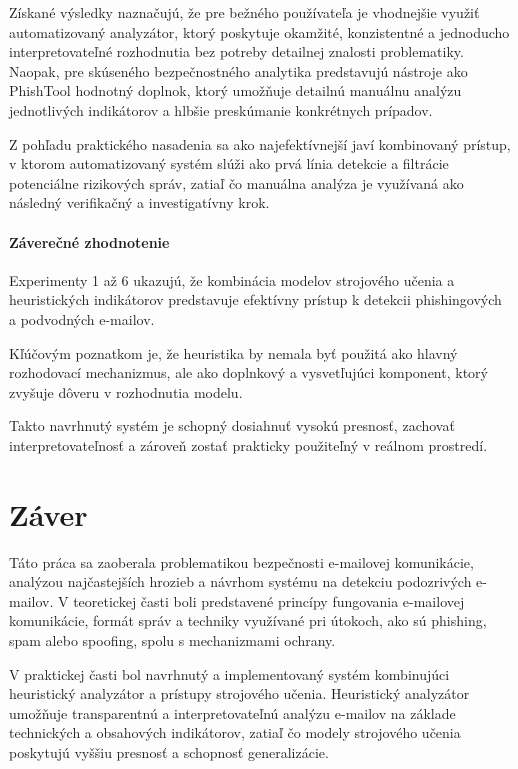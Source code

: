 \documentclass[conference]{IEEEtran}
\begin{document}
Získané výsledky naznačujú, že pre bežného používateľa je vhodnejšie
využiť automatizovaný analyzátor, ktorý poskytuje okamžité,
konzistentné a jednoducho interpretovateľné rozhodnutia bez potreby
detailnej znalosti problematiky. Naopak, pre skúseného bezpečnostného
analytika predstavujú nástroje ako PhishTool hodnotný doplnok, ktorý
umožňuje detailnú manuálnu analýzu jednotlivých indikátorov a hlbšie
preskúmanie konkrétnych prípadov.

Z pohľadu praktického nasadenia sa ako najefektívnejší javí kombinovaný
prístup, v ktorom automatizovaný systém slúži ako prvá línia detekcie
a filtrácie potenciálne rizikových správ, zatiaľ čo manuálna analýza
je využívaná ako následný verifikačný a investigatívny krok.

\paragraph{Záverečné zhodnotenie}

Experimenty 1 až 6 ukazujú, že kombinácia modelov strojového učenia
a heuristických indikátorov predstavuje efektívny prístup k detekcii
phishingových a podvodných e-mailov.

Kľúčovým poznatkom je, že heuristika by nemala byť použitá ako hlavný
rozhodovací mechanizmus, ale ako doplnkový a vysvetľujúci komponent,
ktorý zvyšuje dôveru v rozhodnutia modelu.

Takto navrhnutý systém je schopný dosiahnuť vysokú presnosť,
zachovať interpretovateľnosť a zároveň zostať prakticky použiteľný
v reálnom prostredí.


\section{Záver}

Táto práca sa zaoberala problematikou bezpečnosti e-mailovej komunikácie, analýzou najčastejších hrozieb a návrhom systému na detekciu podozrivých e-mailov. V teoretickej časti boli predstavené princípy fungovania e-mailovej komunikácie, formát správ a techniky využívané pri útokoch, ako sú phishing, spam alebo spoofing, spolu s mechanizmami ochrany.

V praktickej časti bol navrhnutý a implementovaný systém kombinujúci heuristický analyzátor a prístupy strojového učenia. Heuristický analyzátor umožňuje transparentnú a interpretovateľnú analýzu e-mailov na základe technických a obsahových indikátorov, zatiaľ čo modely strojového učenia poskytujú vyššiu presnosť a schopnosť generalizácie.
\end{document}
